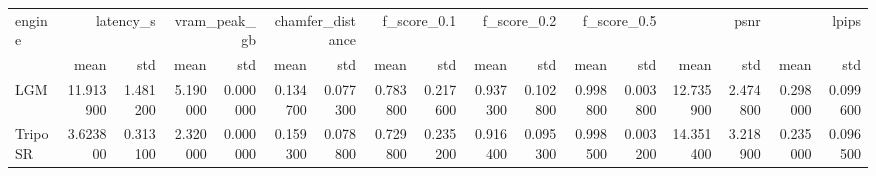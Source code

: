 \begin{tabular}{lrrrrrrrrrrrrrrrr}
\toprule
engine & \multicolumn{2}{r}{latency_s} & \multicolumn{2}{r}{vram_peak_gb} & \multicolumn{2}{r}{chamfer_distance} & \multicolumn{2}{r}{f_score_0.1} & \multicolumn{2}{r}{f_score_0.2} & \multicolumn{2}{r}{f_score_0.5} & \multicolumn{2}{r}{psnr} & \multicolumn{2}{r}{lpips} \\
 & mean & std & mean & std & mean & std & mean & std & mean & std & mean & std & mean & std & mean & std \\
\midrule
LGM & 11.913900 & 1.481200 & 5.190000 & 0.000000 & 0.134700 & 0.077300 & 0.783800 & 0.217600 & 0.937300 & 0.102800 & 0.998800 & 0.003800 & 12.735900 & 2.474800 & 0.298000 & 0.099600 \\
TripoSR & 3.623800 & 0.313100 & 2.320000 & 0.000000 & 0.159300 & 0.078800 & 0.729800 & 0.235200 & 0.916400 & 0.095300 & 0.998500 & 0.003200 & 14.351400 & 3.218900 & 0.235000 & 0.096500 \\
\bottomrule
\end{tabular}

